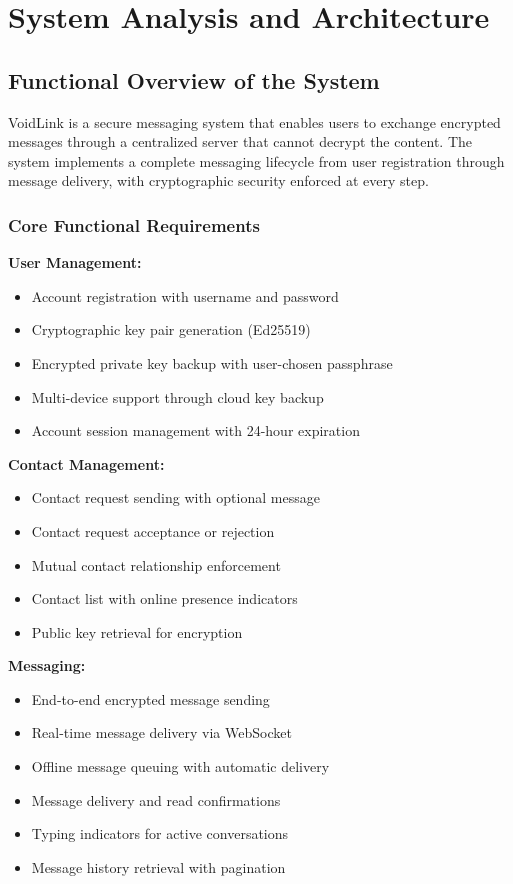 \chapter{System Analysis and Architecture}

\section{Functional Overview of the System}

VoidLink is a secure messaging system that enables users to exchange encrypted messages through a centralized server that cannot decrypt the content. The system implements a complete messaging lifecycle from user registration through message delivery, with cryptographic security enforced at every step.

\subsection{Core Functional Requirements}

\textbf{User Management:}
\begin{itemize}
    \item Account registration with username and password
    \item Cryptographic key pair generation (Ed25519)
    \item Encrypted private key backup with user-chosen passphrase
    \item Multi-device support through cloud key backup
    \item Account session management with 24-hour expiration
\end{itemize}

\textbf{Contact Management:}
\begin{itemize}
    \item Contact request sending with optional message
    \item Contact request acceptance or rejection
    \item Mutual contact relationship enforcement
    \item Contact list with online presence indicators
    \item Public key retrieval for encryption
\end{itemize}

\textbf{Messaging:}
\begin{itemize}
    \item End-to-end encrypted message sending
    \item Real-time message delivery via WebSocket
    \item Offline message queuing with automatic delivery
    \item Message delivery and read confirmations
    \item Typing indicators for active conversations
    \item Message history retrieval with pagination
\end{itemize}

